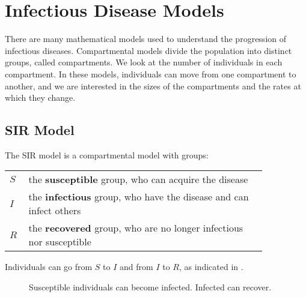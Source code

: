 
    
\section{Infectious Disease Models}
\label{sec:infectious-disease-models}

There are many mathematical models used to understand the progression of infectious diseases.
Compartmental models divide the population into distinct groups,
called compartments.
We look at the number of individuals in each compartment.
In these models,
individuals can move from one compartment to another,
and we are interested in the sizes of the compartments and the rates at which they change.
\cite{bertsimas2014robust}

\subsection{SIR Model}
\label{subsec:infectious-disease-models:sir}

The SIR model is a compartmental model with groups:

\begin{tabular}{p{0.05\linewidth}p{0.8\linewidth}}
    $S$ & the \textbf{susceptible} group,%
    who can acquire the disease\\%
    $I$ & the \textbf{infectious} group,%
    who have the disease and can infect others\\%
    $R$ & the \textbf{recovered} group,%
    who are no longer infectious nor susceptible
\end{tabular}

Individuals can go from $S$ to $I$ and from $I$ to $R$,
as indicated in .

\begin{figure}
    \caption{
        \label{fig:compartment-flow-sir}
        Susceptible individuals can become infected.
        Infected can recover.
    }
\end{figure}


